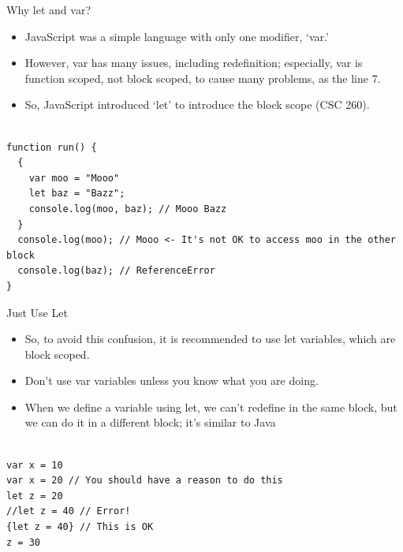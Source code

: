 \begin{frame}[fragile]{Why let and var?}

\begin{itemize}
	\item JavaScript was a simple language with only one modifier, `var.'
	\item However, var has many issues, including redefinition; especially, var is function scoped, not block scoped, to cause many problems, as the line 7. 
	\item So, JavaScript introduced `let' to introduce the block scope (CSC 260). 
\end{itemize}

\begin{Code}{}%
\begin{lstlisting}[firstnumber=1, label=glabels, xleftmargin=0pt, basicstyle=\tiny]% 

function run() {
  {
    var moo = "Mooo"
    let baz = "Bazz";
    console.log(moo, baz); // Mooo Bazz
  }
  console.log(moo); // Mooo <- It's not OK to access moo in the other block
  console.log(baz); // ReferenceError
}
\end{lstlisting}%
\end{Code}%

\end{frame}

\begin{frame}[fragile]{Just Use Let}

\begin{itemize}
	\item So, to avoid this confusion, it is recommended to use let variables, which are block scoped.
	\item Don't use var variables unless you know what you are doing. 
	\item When we define a variable using let, we can't redefine in the same block, but we can do it in a different block; it's similar to Java 
\end{itemize}

\begin{Code}{}%
\begin{lstlisting}[firstnumber=1, label=glabels, xleftmargin=0pt, basicstyle=\scriptsize]% 

var x = 10
var x = 20 // You should have a reason to do this
let z = 20
//let z = 40 // Error!
{let z = 40} // This is OK
z = 30
\end{lstlisting}%
\end{Code}%

\end{frame}